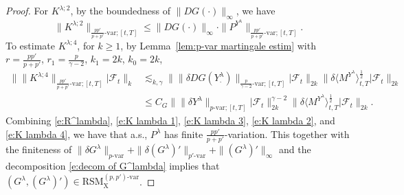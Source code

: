 \documentclass[10pt,a4paper]{amsart}
\begin{document}
\begin{proof}
For $K^{\lambda;2}$, by the boundedness of $\|DG(\bm\cdot)\|_{\infty}$, we have
\begin{equation}\label{e:K lambda 2}
\|K^{\lambda;2}\|_{\frac{pp'}{p + p'}\text{-}\mathrm{var};[t,T]} \le \|DG(\bm\cdot)\|_{\infty} \cdot \|P^{Y^{\lambda}}\|_{\frac{pp'}{p + p'}\text{-}\mathrm{var};[t,T]}.
\end{equation}
To estimate $K^{\lambda;4}$, for $k\ge 1$, by Lemma~\ref{lem:p-var martingale estim} with $r = \frac{pp'}{p+p'}$, $r_1 = \frac{p}{\gamma - 2}$, $k_1 = 2k$, $k_0 = 2k$, 
\begin{equation}\label{e:K lambda 4}
\begin{aligned}
\big\| \| K^{\lambda;4} \|_{\frac{pp'}{p+p'}\text{-}\mathrm{var};[t,T]} \big| \mathcal F_{t}\big\|_{k} &\lesssim_{k,\gamma} \big\| \|\delta DG(Y^{\lambda}_{\bm\cdot})\|_{\frac{p}{\gamma - 2}\text{-}\mathrm{var};[t,T]} \big| \mathcal F_{t} \big\|_{2k} \big\| \delta \langle M^{Y^{\lambda}} \rangle^{\frac{1}{2}}_{t,T} \big| \mathcal F_{t} \big\|_{2k} \\
&\le C_G \big\| \|\delta Y^{\lambda}\|_{p\text{-}\mathrm{var};[t,T]} \big| \mathcal F_t \big\|^{\gamma - 2}_{2k} \big\| \delta \langle M^{Y^{\lambda}} \rangle^{\frac{1}{2}}_{t,T} \big| \mathcal F_{t} \big\|_{2k}. 
\end{aligned}
\end{equation}
Combining \eqref{e:R^lambda}, \eqref{e:K lambda 1}, \eqref{e:K lambda 3}, \eqref{e:K lambda 2}, and \eqref{e:K lambda 4}, we have that a.s., $P^{\lambda}$ has finite $\frac{pp'}{p+p'}$-variation. This together with the finiteness of $\|\delta G^{\lambda}\|_{p\text{-}\mathrm{var}}+\|\delta (G^{\lambda})'\|_{p'\text{-}\mathrm{var}} + \|(G^{\lambda})'\|_{\infty}$ and the decomposition \eqref{e:decom of G^lambda} implies that $(G^{\lambda},(G^{\lambda})') \in \mathrm{RSM}^{(p,p')\text{-}\mathrm{var}}_{\mathrm X}$.


\end{proof}
\end{document}
